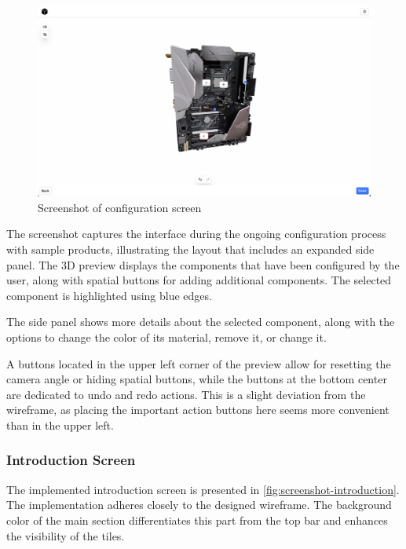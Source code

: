 \begin{figure}[h]
\centering
\includegraphics[width=\textwidth]{images/screenshot_configuration.png}
\caption{Screenshot of configuration screen}
\label{fig:screenshot-configuration}
\end{figure}

The screenshot captures the interface during the ongoing configuration process with sample products, illustrating the layout that includes an expanded side panel. The 3D preview displays the components that have been configured by the user, along with spatial buttons for adding additional components. The selected component is highlighted using blue edges.

The side panel shows more details about the selected component, along with the options to change the color of its material, remove it, or change it.

A buttons located in the upper left corner of the preview allow for resetting the camera angle or hiding spatial buttons, while the buttons at the bottom center are dedicated to undo and redo actions. This is a slight deviation from the wireframe, as placing the important action buttons here seems more convenient than in the upper left.


\subsubsection{Introduction Screen}

The implemented introduction screen is presented in \autoref{fig:screenshot-introduction}. The implementation adheres closely to the designed wireframe. The background color of the main section differentiates this part from the top bar and enhances the visibility of the tiles.

